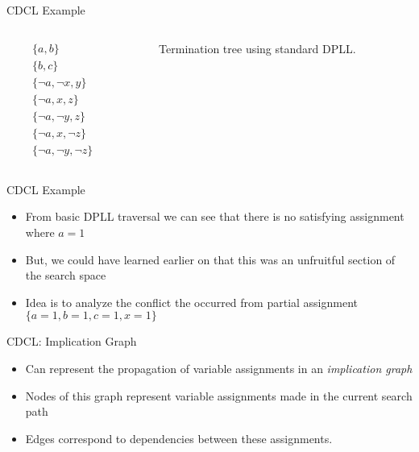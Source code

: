 \documentclass{beamer}
\begin{document}
\begin{frame}{CDCL Example}

    \begin{columns}
        \begin{column}{0.25\textwidth}
            \begin{align*}
                &\{a,b\}\\
                &\{b,c\}\\
                &\{\neg a, \neg x, y\} \\
                &\{\neg a, x, z\} \\
                &\{ \neg a, \neg y, z\} \\
                &\{ \neg a, x, \neg z\} \\
                &\{ \neg a, \neg y, \neg z\}
            \end{align*}
        \end{column}

        \begin{column}{0.65\textwidth}
            \begin{figure}
                
                \caption{Termination tree using standard DPLL.}
            \end{figure}
        \end{column}
    \end{columns}
\end{frame}

\begin{frame}{CDCL Example}
\begin{itemize}
    \item From basic DPLL traversal we can see that there is no satisfying assignment where $a=1$
    \item But, we could have learned earlier on that this was an unfruitful section of the search space
    \item Idea is to analyze the conflict the occurred from partial assignment $\{a=1,b=1,c=1,x=1\}$
\end{itemize}
\end{frame}


\begin{frame}{CDCL: Implication Graph}
\begin{itemize}
    \item Can represent the propagation of variable assignments in an \textit{implication graph}
    \item Nodes of this graph represent variable assignments made in the current search path
    \item Edges correspond to dependencies between these assignments.
\end{itemize}
\end{frame}
\end{document}
